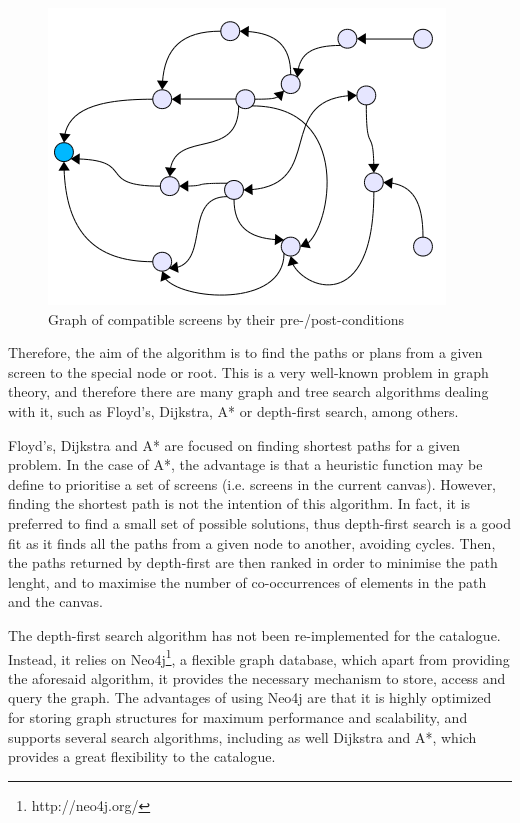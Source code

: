 \documentclass{fast_latex}
\begin{document}
\begin{figure}[htb]
\label{fig:screens_graph}
\begin{center}
	\includegraphics{images/screens_graph}
	\caption{Graph of compatible screens by their pre-/post-conditions}
\end{center}
\end{figure}

Therefore, the aim of the algorithm is to find the paths or plans from a given screen to the special node or root. This is a very well-known problem in graph theory, and therefore there are many graph and tree search algorithms dealing with it, such as Floyd's, Dijkstra, A* or depth-first search, among others.

Floyd's, Dijkstra and A* are focused on finding shortest paths for a given problem. In the case of A*, the advantage is that a heuristic function may be define to prioritise a set of screens (i.e. screens in the current canvas). However, finding the shortest path is not the intention of this algorithm. In fact, it is preferred to find a small set of possible solutions, thus depth-first search is a good fit as it finds all the paths from a given node to another, avoiding cycles. Then, the paths returned by depth-first are then ranked in order to minimise the path lenght, and to maximise the number of co-occurrences of elements in the path and the canvas.

The depth-first search algorithm has not been re-implemented for the catalogue. Instead, it relies on Neo4j\footnote{http://neo4j.org/}, a flexible graph database, which apart from providing the aforesaid algorithm, it provides the necessary mechanism to store, access and query the graph. The advantages of using Neo4j are that it is highly optimized for storing graph structures for maximum performance and scalability, and supports several search algorithms, including as well Dijkstra and A*, which provides a great flexibility to the catalogue.
\end{document}
